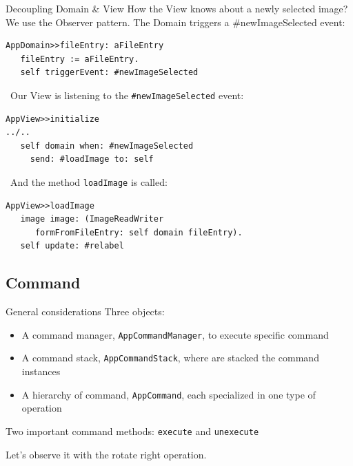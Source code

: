 \documentclass{beamer}
\newcommand{\tip}{\boldmath{\textcolor{red}{$\Rightarrow$}}}
\begin{document}
\begin{frame}[fragile]{Decoupling Domain \& View}
  How the View knows about a newly selected image? We use the Observer
  pattern. The Domain triggers a \#newImageSelected event:

  \fontsize{10pt}{8pt}\selectfont
  \begin{lstlisting}[language=Smalltalk]
AppDomain>>fileEntry: aFileEntry
   fileEntry := aFileEntry.
   self triggerEvent: #newImageSelected
 \end{lstlisting}
 
 \tip\ Our View is listening to the \texttt{\#newImageSelected} event:
 \begin{lstlisting}[language=Smalltalk]
AppView>>initialize
../..
   self domain when: #newImageSelected
     send: #loadImage to: self
 \end{lstlisting}

  \tip\ And the method \texttt{loadImage} is called:
  \begin{lstlisting}[language=Smalltalk]
AppView>>loadImage
   image image: (ImageReadWriter
      formFromFileEntry: self domain fileEntry).
   self update: #relabel
  \end{lstlisting}

\end{frame}

\subsection{Command}
\begin{frame}{General considerations}
  Three objects:
  \begin{itemize}
  \item A command manager, \texttt{AppCommandManager}, to execute
    specific command
  \item A command stack, \texttt{AppCommandStack}, where are stacked the command instances
  \item A hierarchy of command, \texttt{AppCommand}, each specialized
    in one type of operation
  \end{itemize}

  Two important command methods: \texttt{execute} and
  \texttt{unexecute}

  Let's observe it with the rotate right operation.
\end{frame}
\end{document}
